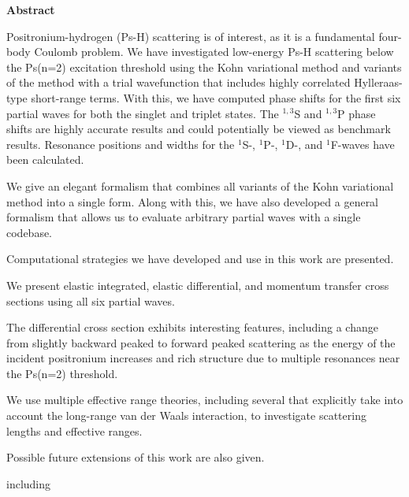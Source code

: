
\thispagestyle{plain}
\begin{center}
    \large
    \textbf{Abstract}
\end{center}

Positronium-hydrogen (Ps-H) scattering is of interest, as it is a fundamental 
four-body Coulomb problem. We have investigated low-energy Ps-H scattering 
below the Ps(n=2) excitation threshold using the Kohn variational method and 
variants of the method with a trial wavefunction that includes highly 
correlated Hylleraas-type short-range terms. With this, we have computed 
phase shifts for the first six partial waves for both the singlet and triplet 
states. The $^{1,3}$S and $^{1,3}$P phase shifts are highly accurate results
and could potentially be viewed as benchmark results.
Resonance positions and widths for the $^1$S-, $^1$P-, $^1$D-, and
$^1$F-waves have been calculated.

We give an elegant formalism that combines all variants of the Kohn variational
method into a single form. Along with this, we have also developed a general
formalism that allows us to evaluate arbitrary partial waves with a single
codebase.

Computational strategies we have developed and use in this work are presented.

We present elastic integrated, elastic differential, and momentum transfer 
cross sections using all six partial waves. 

The differential cross section exhibits interesting features, including a 
change from slightly backward peaked to forward peaked scattering as the 
energy of the incident positronium increases and rich structure due to 
multiple resonances near the Ps(n=2) threshold.

We use multiple effective range theories, including several that explicitly
take into account the long-range van der Waals interaction, to investigate
scattering lengths and effective ranges.

Possible future extensions of this work are also given.

including